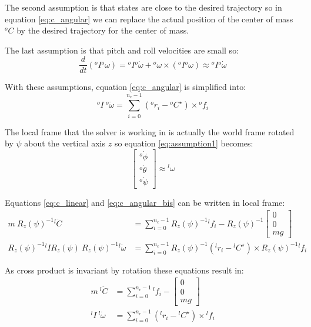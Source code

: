 \documentclass[a4paper,11pt]{article}
\begin{document}
The second assumption is that states are close to the desired trajectory so in equation \ref{eq:c_angular} we can replace the actual position of the center of mass ${}^o\!C$ by the desired trajectory for the center of mass.

The last assumption is that pitch and roll velocities are small so:
\begin{equation}
	\frac{d}{dt}({}^o\!I {}^o\!\omega) = {}^o\!I {}^o\! \dot \omega + {}^o\! \omega \times ({}^o\!I {}^o\! \omega) \approx {}^o\!I {}^o\! \dot \omega
\end{equation}

With these assumptions, equation \ref{eq:c_angular} is simplified into:
\begin{equation}
{}^o\!I ~ {}^o\! \dot \omega = \sum_{i=0}^{n_c - 1} ({}^o\!r_i - {}^o\!C^\star) \times {}^o\!f_i \label{eq:c_angular_bis}
\end{equation}

The local frame that the solver is working in is actually the world frame rotated by $\psi$ about the vertical axis $z$ so equation \ref{eq:assumption1} becomes:
\begin{equation}
\begin{bmatrix} {}^o\! \dot \phi \\ {}^o\! \dot \theta \\ {}^o\! \dot \psi \end{bmatrix} \approx {}^l\!\omega 
\end{equation}

Equations \ref{eq:c_linear} and \ref{eq:c_angular_bis} can be written in local frame:
\begin{align}
m ~ R_z(\psi)^{-1} {}^l\!  \ddot C &= \sum_{i=0}^{n_c - 1} R_z(\psi)^{-1} {}^l\!f_i - R_z(\psi)^{-1} \begin{bmatrix} 0 \\ 0 \\ mg \end{bmatrix} \\
R_z(\psi)^{-1} {}^l\!I R_z(\psi) ~ R_z(\psi)^{-1} {}^l\! \dot \omega &= \sum_{i=0}^{n_c - 1} R_z(\psi)^{-1} ({}^l\!r_i - {}^l\!C^\star) \times R_z(\psi)^{-1} {}^l\!f_i
\end{align}

As cross product is invariant by rotation these equations result in:
\begin{align}
m ~ {}^l\!  \ddot C &= \sum_{i=0}^{n_c - 1} {}^l\!f_i - \begin{bmatrix} 0 \\ 0 \\ mg \end{bmatrix} \\
{}^l\!I ~ {}^l\! \dot \omega &= \sum_{i=0}^{n_c - 1} ({}^l\!r_i - {}^l\!C^\star) \times {}^l\!f_i
\end{align}
\end{document}

